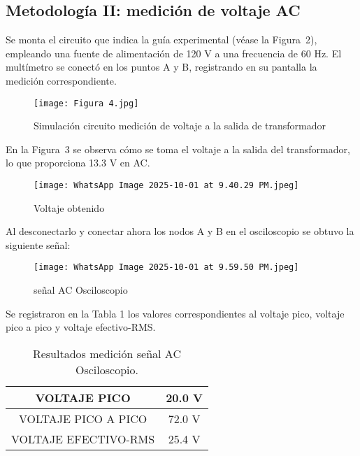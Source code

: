 \documentclass[conference]{IEEEtran} %
\begin{document}
\subsection{Metodología II: medición de voltaje AC}
Se monta el circuito que indica la guía experimental (véase la Figura~2), empleando una fuente de alimentación de 120 V a una frecuencia de 60 Hz. El multímetro se conectó en los puntos A y B, registrando en su pantalla la medición correspondiente.
\begin{figure}[H]
    \centering
    \texttt{[image: Figura 4.jpg]}
    \caption{Simulación circuito medición de voltaje a la salida de transformador}
    \label{fig:placeholder}
\end{figure}
En la Figura~3 se observa cómo se toma el voltaje a la salida del transformador, lo que proporciona 13.3 V en AC.
\begin{figure}[H]
    \centering
    \texttt{[image: WhatsApp Image 2025-10-01 at 9.40.29 PM.jpeg]}
    \caption{Voltaje obtenido}
    \label{fig:placeholder}
\end{figure}
Al desconectarlo y conectar ahora los nodos A y B en el osciloscopio se obtuvo la siguiente señal:
\begin{figure}[H]
    \centering
    \texttt{[image: WhatsApp Image 2025-10-01 at 9.59.50 PM.jpeg]}
    \caption{señal AC Osciloscopio}
    \label{fig:placeholder}
\end{figure}
Se registraron en la Tabla 1 los valores correspondientes al voltaje pico, voltaje pico a pico y voltaje efectivo-RMS.
\begin{table}[H]
    \centering
    \caption{Resultados medición señal AC Osciloscopio.}
    \label{tab:ejemplo}
    \begin{tabular}{|c|c|}
        \hline
        VOLTAJE PICO & 20.0 V  \\ \hline
        VOLTAJE PICO A PICO    & 72.0 V     \\ \hline
        VOLTAJE EFECTIVO-RMS   & 25.4 V     \\ \hline
    \end{tabular}
\end{table}
\end{document}
